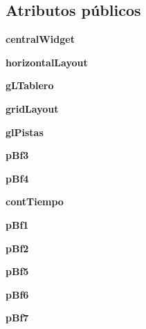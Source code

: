 \subsection*{Atributos públicos}
\begin{DoxyCompactItemize}
\item 
{\bfseries central\-Widget}\label{classui__sudoku_1_1_ui___sudoku_a2301cee8d2de21fad31bac7d9929c501}

\item 
{\bfseries horizontal\-Layout}\label{classui__sudoku_1_1_ui___sudoku_ad15cdd7e6072c1f49ce54899a1c458ad}

\item 
{\bfseries g\-L\-Tablero}\label{classui__sudoku_1_1_ui___sudoku_ad66ebdce406d7a9a601a84a451bf638e}

\item 
{\bfseries grid\-Layout}\label{classui__sudoku_1_1_ui___sudoku_acfc8f17199ae55d62d336bf60e412625}

\item 
{\bfseries gl\-Pistas}\label{classui__sudoku_1_1_ui___sudoku_a5ee37a30e3a8ca9f49d7695ea09ea9e5}

\item 
{\bfseries p\-Bf3}\label{classui__sudoku_1_1_ui___sudoku_adddd39056c8a6cfe3301101842b6f266}

\item 
{\bfseries p\-Bf4}\label{classui__sudoku_1_1_ui___sudoku_acf867d79729618c2a213d62da489bc3c}

\item 
{\bfseries cont\-Tiempo}\label{classui__sudoku_1_1_ui___sudoku_ac406346f8929bc2091a6c663a5852984}

\item 
{\bfseries p\-Bf1}\label{classui__sudoku_1_1_ui___sudoku_a00af531da13f6987b806b5ed4e1084fc}

\item 
{\bfseries p\-Bf2}\label{classui__sudoku_1_1_ui___sudoku_a844c80d75a61e67673665675ddb6b38e}

\item 
{\bfseries p\-Bf5}\label{classui__sudoku_1_1_ui___sudoku_a409facddb839cfce9cae3a25c51dd119}

\item 
{\bfseries p\-Bf6}\label{classui__sudoku_1_1_ui___sudoku_a69dfec0542034ea467e5108f8ecd984e}

\item 
{\bfseries p\-Bf7}\label{classui__sudoku_1_1_ui___sudoku_a251bebee338297e5d2988eb9d978d1a3}


\end{DoxyCompactItemize}
